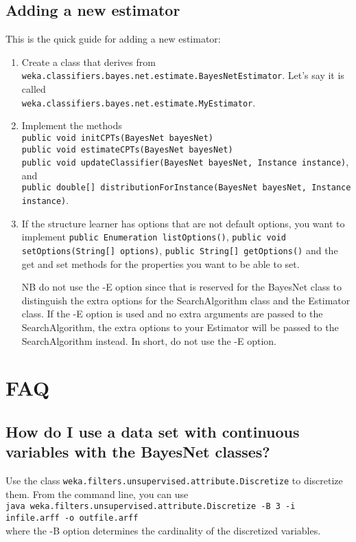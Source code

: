 \subsection*{Adding a new estimator}

This is the quick guide for adding a new estimator:

\begin{enumerate}
\item Create a class that derives from \\
  {\tt weka.classifiers.bayes.net.estimate.BayesNetEstimator}.
  Let's say it is called \\
  {\tt weka.classifiers.bayes.net.estimate.MyEstimator}.

\item Implement the methods\\
{\tt public void initCPTs(BayesNet bayesNet)} \\
{\tt public void estimateCPTs(BayesNet bayesNet)} \\
{\tt public void updateClassifier(BayesNet bayesNet, Instance instance)}, and \\
{\tt  public double[] distributionForInstance(BayesNet bayesNet, Instance instance)}.

\item If the structure learner has options that are not default options,
you want to implement {\tt public Enumeration listOptions()},
{\tt public void setOptions(String[] options)},
{\tt public String[] getOptions()} and the get and set methods for
the properties you want to be able to set.

NB do not use the -E option since that is reserved for the BayesNet class to 
distinguish the extra options for the SearchAlgorithm class and the Estimator class.
If the -E option is used and no extra arguments are passed to the SearchAlgorithm,
the extra options to your Estimator will be passed to the SearchAlgorithm
instead. In short, do not use the -E option.
\end{enumerate}

\section{FAQ}

\subsection*{How do I use a data set with continuous variables with the BayesNet classes?}
Use the class {\tt weka.filters.unsupervised.attribute.Discretize} to discretize them.
From the command line, you can use\\
{\tt java weka.filters.unsupervised.attribute.Discretize -B 3 -i infile.arff -o outfile.arff}\\
where the -B option determines the cardinality of the discretized variables.

